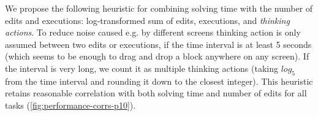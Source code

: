 We propose the following heuristic for combining solving time with the number of edits and executions: log-transformed sum of edits, executions, and \emph{thinking actions}.
To reduce noise caused e.g. by different screens
thinking action is only assumed between two edits
or executions, if the time interval is at least 5 seconds (which seems to be enough
to drag and drop a block anywhere on any screen). If the interval is very long,
we count it as multiple thinking actions (taking $log_5$ from the time interval
and rounding it down to the closest integer).
This heuristic retains reasonable correlation with both solving time
and number of edits for all tasks (\cref{fig:performance-corrs-p10}).



